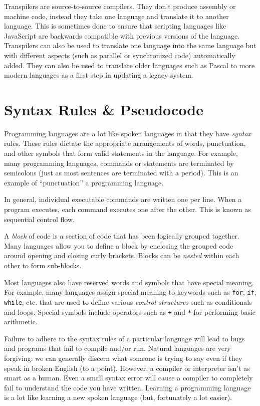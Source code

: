 Transpilers are source-to-source compilers.  They don't produce assembly
or machine code, instead they take one language and translate it to
another language.  This is sometimes done to ensure that scripting languages
like JavaScript are backwards compatible with previous versions of the language.
Transpilers can also be used to translate one language into the same language
but with different aspects (such as parallel or synchronized code) automatically
added.  They can also be used to translate older languages such as Pascal
to more modern languages as a first step in updating a legacy system.

\clearpage 

\section{Syntax Rules \& Pseudocode}

Programming languages are a lot like spoken languages in that they have 
\emph{syntax} rules.  These rules dictate the appropriate arrangements of words,
punctuation, and other symbols that form valid statements in the language.
For example, many programming languages, commands or statements are terminated
by semicolons (just as most sentences are terminated with a period).  
This is an example of ``punctuation'' a programming language.  

In general, individual executable commands are written one per line.  When 
a program executes, each command executes one after the other.  This is
known as sequential control flow.

A \emph{block} of code is a section of code that has been logically grouped
together.  Many languages allow you to define a block by enclosing the
grouped code around opening and closing curly brackets.  Blocks can
be \emph{nested} within each other to form sub-blocks.

Most languages also have reserved words and symbols that have special 
meaning.  For example, many languages assign special meaning to keywords
such as \texttt{for}, \texttt{if}, \texttt{while}, etc. that 
are used to define various \emph{control structures} such as conditionals and
loops.  Special symbols include operators such as \texttt{+} and 
\texttt{*} for performing basic arithmetic.

Failure to adhere to the syntax rules of a particular language will 
lead to bugs and programs that fail to compile and/or run.  Natural
languages are very forgiving: we can generally discern what someone 
is trying to say even if they speak in broken English (to a point).  
However, a compiler or interpreter isn't as smart as a human.  Even
a small syntax error will cause a compiler to completely fail to 
understand the code you have written.  Learning a programming
language is a lot like learning a new spoken language (but, fortunately
a lot easier).  

